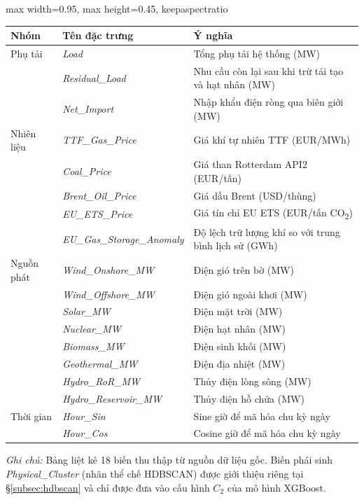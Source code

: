 \begin{strip}
\centering
{}
\label{tab:feature_definitions}
\begin{adjustbox}{max width=0.95\textwidth, max height=0.45\textheight, keepaspectratio}
\begin{tabularx}{\textwidth}{@{}l l X@{}}
\toprule
Nhóm & Tên đặc trưng & Ý nghĩa \\
\midrule
Phụ tải
  & \textit{Load} & Tổng phụ tải hệ thống (MW) \\
  & \textit{Residual\_Load} & Nhu cầu còn lại sau khi trừ tái tạo và hạt nhân (MW) \\
  & \textit{Net\_Import} & Nhập khẩu điện ròng qua biên giới (MW) \\
\midrule
Nhiên liệu
  & \textit{TTF\_Gas\_Price} & Giá khí tự nhiên TTF (EUR/MWh) \\
  & \textit{Coal\_Price} & Giá than Rotterdam API2 (EUR/tấn) \\
  & \textit{Brent\_Oil\_Price} & Giá dầu Brent (USD/thùng) \\
  & \textit{EU\_ETS\_Price} & Giá tín chỉ EU ETS (EUR/tấn CO\textsubscript{2}) \\
  & \textit{EU\_Gas\_Storage\_Anomaly} & Độ lệch trữ lượng khí so với trung bình lịch sử (GWh) \\
\midrule
Nguồn phát
  & \textit{Wind\_Onshore\_MW} & Điện gió trên bờ (MW) \\
  & \textit{Wind\_Offshore\_MW} & Điện gió ngoài khơi (MW) \\
  & \textit{Solar\_MW} & Điện mặt trời (MW) \\
  & \textit{Nuclear\_MW} & Điện hạt nhân (MW) \\
  & \textit{Biomass\_MW} & Điện sinh khối (MW) \\
  & \textit{Geothermal\_MW} & Điện địa nhiệt (MW) \\
  & \textit{Hydro\_RoR\_MW} & Thủy điện lòng sông (MW) \\
  & \textit{Hydro\_Reservoir\_MW} & Thủy điện hồ chứa (MW) \\
\midrule
Thời gian
  & \textit{Hour\_Sin} & Sine giờ để mã hóa chu kỳ ngày \\
  & \textit{Hour\_Cos} & Cosine giờ để mã hóa chu kỳ ngày \\
\bottomrule
\end{tabularx}
\end{adjustbox}
\begin{minipage}{0.9\textwidth}
  \vspace{0.15cm}
  \small\textit{Ghi chú:} Bảng liệt kê 18 biến thu thập từ nguồn dữ liệu gốc. Biến phái sinh \textit{Physical\_Cluster} (nhãn thể chế HDBSCAN) được giới thiệu riêng tại \S\ref{subsec:hdbscan} và chỉ được đưa vào cấu hình $C_2$ của mô hình XGBoost.
\end{minipage}
\end{strip}

